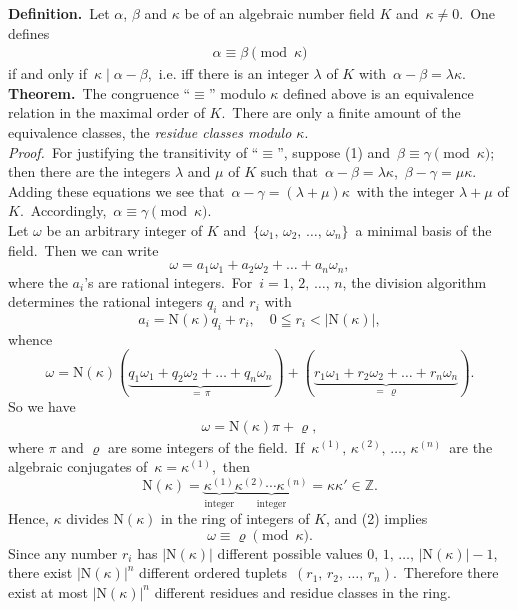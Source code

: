 \documentclass[12pt]{article}
\theoremstyle{definition}
\begin{document}
 
\textbf{Definition.}\, Let $\alpha$, $\beta$ and $\kappa$ be  of an algebraic number field $K$ and\, $\kappa \neq 0$.\, One defines
\begin{align}
\alpha \equiv \beta \pmod{\kappa}
\end{align}
if and only if\, $\kappa \mid \alpha\!-\!\beta$,\, i.e. iff there is an integer $\lambda$ of $K$ with\, 
$\alpha\!-\!\beta = \lambda\kappa$.\\

\textbf{Theorem.}\, The congruence ``$\equiv$'' modulo $\kappa$ defined above is an equivalence relation in the maximal order of $K$.\, There are only a finite amount of the equivalence classes, the {\em residue classes modulo $\kappa$}.\\

{\em Proof.}\, For justifying the transitivity of ``$\equiv$'', suppose (1) and\, $\beta \equiv \gamma \pmod{\kappa}$; then there are the integers $\lambda$ and $\mu$ of $K$ such that\, $\alpha\!-\!\beta = \lambda\kappa$,\, 
$\beta\!-\!\gamma = \mu\kappa$.\, Adding these equations we see that\, $\alpha\!-\!\gamma = (\lambda\!+\!\mu)\kappa$\, with the integer $\lambda\!+\!\mu$ of $K$.\, Accordingly, \,$\alpha \equiv \gamma \pmod{\kappa}$.\\
Let $\omega$ be an arbitrary integer of $K$ and\, $\{\omega_1,\,\omega_2,\,\ldots,\,\omega_n\}$\, a minimal basis of the field.\, Then we can write
$$\omega = a_1\omega_1+a_2\omega_2+\ldots+a_n\omega_n,$$
where the $a_i$'s are rational integers.\, For\, $i = 1,\,2,\,\ldots,\,n$, the division algorithm determines the rational integers $q_i$ and $r_i$ with
$$a_i = \mbox{N}(\kappa)q_i+r_i, \quad 0 \leqq r_i < |\mbox{N}(\kappa)|,$$
whence
$$\omega = \mbox{N}(\kappa)(\underbrace{q_1\omega_1+q_2\omega_2+\ldots+q_n\omega_n}_{=\,\pi})
+(\underbrace{r_1\omega_1+r_2\omega_2+\ldots+r_n\omega_n}_{=\,\varrho}).$$
So we have
\begin{align}
\omega = \mbox{N}(\kappa)\pi\!+\!\varrho,
\end{align}
where $\pi$ and $\varrho$ are some integers of the field.\, If\, $\kappa^{(1)},\,\kappa^{(2)},\,\ldots,\,\kappa^{(n)}$\, are the algebraic conjugates of\, $\kappa = \kappa^{(1)}$,\, then 
$$\mbox{N}(\kappa) = \underbrace{\kappa^{(1)}}_{\mbox{integer}}\underbrace{\kappa^{(2)}\cdots\kappa^{(n)}}_{\mbox{integer}} = \kappa\kappa' \in \mathbb{Z}.$$
Hence, $\kappa$ divides $\mbox{N}(\kappa)$ in the ring of integers of $K$, and (2) implies
$$\omega \equiv \varrho \pmod\kappa.$$
Since any number $r_i$ has $|\mbox{N}(\kappa)|$ different possible values $0,\,1,\,\ldots,\,|\mbox{N}(\kappa)|\!-\!1$, there exist $|\mbox{N}(\kappa)|^n$ different ordered tuplets \,$(r_1,\,r_2,\,\ldots,\,r_n)$.\, Therefore there exist at most 
$|\mbox{N}(\kappa)|^n$ different residues and residue classes in the ring.




\end{document}
